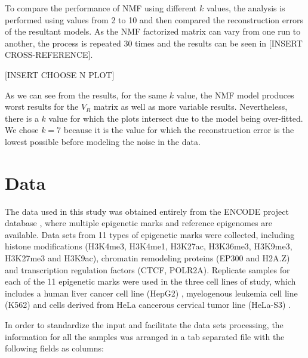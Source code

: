 \medskip

To compare the performance of NMF using different \(k\) values, the analysis is performed using values from 2 to 10 and then compared the reconstruction errors of the resultant models. As the NMF factorized matrix can vary from one run to another, the process is repeated 30 times and the results can be seen in [INSERT CROSS-REFERENCE].

\medskip

[INSERT CHOOSE N PLOT]

\medskip

As we can see from the results, for the same \(k\) value, the NMF model produces worst results for the \(V_R\) matrix as well as more variable results. Nevertheless, there is a \(k\) value for which the plots intersect due to the model being over-fitted. We chose \(k = 7\) because it is the value for which the reconstruction error is the lowest possible before modeling the noise in the data.


\section{Data}

The data used in this study was obtained entirely from the ENCODE project database \cite{Feingold2004}, where multiple epigenetic marks and reference epigenomes are available. Data sets from 11 types of epigenetic marks were collected, including histone modifications (H3K4me3, H3K4me1, H3K27ac, H3K36me3, H3K9me3, H3K27me3 and H3K9ac), chromatin remodeling proteins (EP300 and H2A.Z) and transcription regulation factors (CTCF, POLR2A). Replicate samples for each of the 11 epigenetic marks were used in the three cell lines of study, which includes a human liver cancer cell line (HepG2) \cite{Aden1979}, myelogenous leukemia cell line (K562) \cite{Andersson1979} and cells derived from HeLa cancerous cervical tumor line (HeLa-S3) \cite{Douglas1973,Chen2008}.

\medskip

In order to standardize the input and facilitate the data sets processing, the information for all the samples was arranged in a tab separated file with the following fields as columns:

